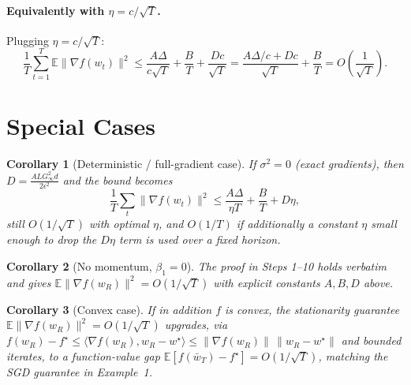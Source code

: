 \documentclass[11pt]{article}
\newtheorem{corollary}{Corollary}
\begin{document}
\paragraph{Equivalently with $\eta = c/\sqrt T$.}
Plugging $\eta=c/\sqrt T$:
\[
\frac1T\sum_{t=1}^T\mathbb{E}\|\nabla f(w_t)\|^2
\le \frac{A\Delta}{c\sqrt T} + \frac{B}{T} + \frac{Dc}{\sqrt T}
= \frac{A\Delta/c + Dc}{\sqrt T} + \frac{B}{T}
= O\!\left(\frac{1}{\sqrt T}\right).
\]

\section*{Special Cases}

\begin{corollary}[Deterministic / full-gradient case]
If $\sigma^2=0$ (exact gradients), then $D=\frac{A L G_\infty^2 d}{2\epsilon^2}$
and the bound becomes
\[
\frac1T\sum_t\|\nabla f(w_t)\|^2
\le \frac{A\Delta}{\eta T} + \frac{B}{T} + D\eta,
\]
still $O(1/\sqrt T)$ with optimal $\eta$, and $O(1/T)$ if additionally a
constant $\eta$ small enough to drop the $D\eta$ term is used over a fixed
horizon.
\end{corollary}

\begin{corollary}[No momentum, $\beta_1=0$]
The proof in Steps 1--10 holds verbatim and gives
$\mathbb{E}\|\nabla f(w_R)\|^2 = O(1/\sqrt T)$ with explicit constants
$A,B,D$ above.
\end{corollary}

\begin{corollary}[Convex case]
If in addition $f$ is convex, the stationarity guarantee
$\mathbb{E}\|\nabla f(w_R)\|^2=O(1/\sqrt T)$ upgrades, via
$f(w_R)-f^\star\le \langle\nabla f(w_R),w_R-w^\star\rangle
\le \|\nabla f(w_R)\|\,\|w_R-w^\star\|$ and bounded iterates, to a
function-value gap $\mathbb{E}[f(\bar w_T)-f^\star]=O(1/\sqrt T)$, matching the
SGD guarantee in Example~1.
\end{corollary}
\end{document}
